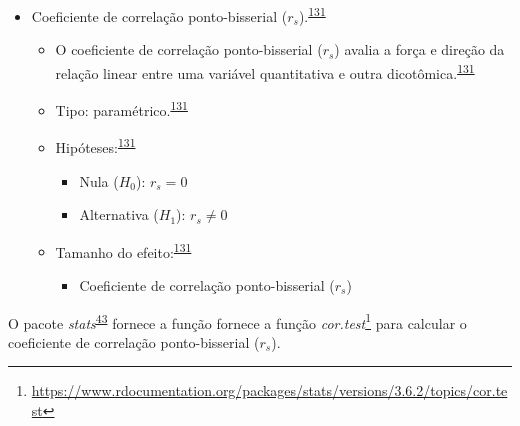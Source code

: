 \documentclass[
  a4paper,
]{book}
\providecommand{\tightlist}{%
  \setlength{\itemsep}{0pt}\setlength{\parskip}{0pt}}
\renewcommand{\href}[2]{#2\footnote{\url{#1}}}
\newenvironment{infobox}[1]
  {
  \begin{itemize}
  \renewcommand{\labelitemi}{
    \raisebox{-.7\height}[0pt][0pt]{
      {\setkeys{Gin}{width=3em,keepaspectratio}
        \texttt{[image: \#1]}}
    }
  }
  \setlength{\fboxsep}{1em}
  \begin{blackbox}
  \item
  }
  {
  \end{blackbox}
  \end{itemize}
  }
\begin{document}
\begin{itemize}
\item
  Coeficiente de correlação ponto-bisserial (\(r_{s}\)).\textsuperscript{\protect\hyperlink{ref-khamis2008}{131}}

  \begin{itemize}
  \item
    O coeficiente de correlação ponto-bisserial (\(r_{s}\)) avalia a força e direção da relação linear entre uma variável quantitativa e outra dicotômica.\textsuperscript{\protect\hyperlink{ref-khamis2008}{131}}
  \item
    Tipo: paramétrico.\textsuperscript{\protect\hyperlink{ref-khamis2008}{131}}
  \item
    Hipóteses:\textsuperscript{\protect\hyperlink{ref-khamis2008}{131}}

    \begin{itemize}
    \item
      Nula (\(H_{0}\)): \(r_{s}=0\)
    \item
      Alternativa (\(H_{1}\)): \(r_{s}≠0\)
    \end{itemize}
  \item
    Tamanho do efeito:\textsuperscript{\protect\hyperlink{ref-khamis2008}{131}}

    \begin{itemize}
    \tightlist
    \item
      Coeficiente de correlação ponto-bisserial (\(r_{s}\))
    \end{itemize}
  \end{itemize}
\end{itemize}

\begin{infobox}{images/Rlogo}
O pacote \emph{stats}\textsuperscript{\protect\hyperlink{ref-stats-2}{43}} fornece a função fornece a função \href{https://www.rdocumentation.org/packages/stats/versions/3.6.2/topics/cor.test}{\emph{cor.test}} para calcular o coeficiente de correlação ponto-bisserial (\(r_{s}\)).

\end{infobox}
\end{document}
